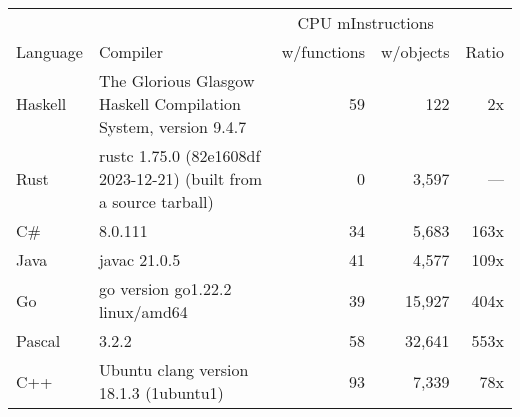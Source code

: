 \documentclass{article}
\begin{document}
      \begin{tabularx}{\linewidth}{lXrrr}
      \toprule
        & & \multicolumn{2}{c}{CPU mInstructions} & \\
        Language & Compiler & w/functions & w/objects & Ratio \\
      \midrule
    Haskell & The Glorious Glasgow Haskell Compilation System, version 9.4.7 & 59 & 122 & 2x \\
Rust & rustc 1.75.0 (82e1608df 2023-12-21) (built from a source tarball) & 0 & 3,597 & --- \\
C\# & 8.0.111 & 34 & 5,683 & 163x \\
Java & javac 21.0.5 & 41 & 4,577 & 109x \\
Go & go version go1.22.2 linux/amd64 & 39 & 15,927 & 404x \\
Pascal & 3.2.2 & 58 & 32,641 & 553x \\
C++ & Ubuntu clang version 18.1.3 (1ubuntu1) & 93 & 7,339 & 78x \\

      \bottomrule
      \end{tabularx}
      
\end{document}
